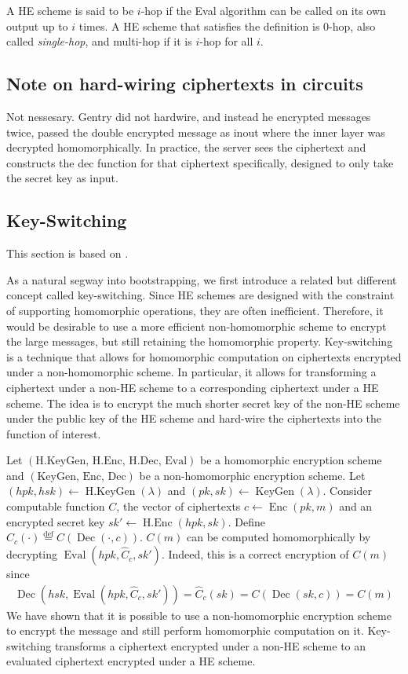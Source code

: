 A HE scheme is said to be $i$-hop if the Eval algorithm can be called on its own output up to $i$ times. A HE scheme that satisfies the definition is $0$-hop, also called \textit{single-hop}, and multi-hop if it is $i$-hop for all $i$. 

\subsection*{Note on hard-wiring ciphertexts in circuits}
Not nessesary. Gentry did not hardwire, and instead he encrypted messages twice, passed the double encrypted message as inout where the inner layer was decrypted homomorphically.
In practice, the server sees the ciphertext and constructs the dec function for that ciphertext specifically, designed to only take the secret key as input.

\subsection*{Key-Switching}
This section is based on \cite{Bra18-survey}.

As a natural segway into bootstrapping, we first introduce a related but different concept called key-switching. Since HE schemes are designed with the constraint of supporting homomorphic operations, they are often inefficient. Therefore, it would be desirable to use a more efficient non-homomorphic scheme to encrypt the large messages, but still retaining the homomorphic property. Key-switching is a technique that allows for homomorphic computation on ciphertexts encrypted under a non-homomorphic scheme. In particular, it allows for transforming a ciphertext under a non-HE scheme to a corresponding ciphertext under a HE scheme. The idea is to encrypt the much shorter secret key of the non-HE scheme under the public key of the HE scheme and hard-wire the ciphertexts into the function of interest.

Let $(\text{H.KeyGen, H.Enc, H.Dec, Eval})$ be a homomorphic encryption scheme and $(\text{KeyGen, Enc, Dec})$ be a non-homomorphic encryption scheme. Let $(hpk,hsk) \leftarrow \operatorname{H.KeyGen}(\lambda)$ and $(pk,sk) \leftarrow \operatorname{KeyGen}(\lambda)$. Consider computable function $C$, the vector of ciphertexts $c \leftarrow \operatorname{Enc}(pk,m)$ and an encrypted secret key $sk' \leftarrow \operatorname{H.Enc}(hpk,sk)$. Define $\hat{C}_c(\cdot) \stackrel{\mathrm{def}}{=} C(\operatorname{Dec}(\cdot, c))$. $C(m)$ can be computed homomorphically by decrypting $\operatorname{Eval}(hpk,\hat{C}_c, sk')$. Indeed, this is a correct encryption of $C(m)$ since
\begin{equation*}
    \begin{aligned}
        \operatorname{Dec}(hsk,\operatorname{Eval}(hpk,\hat{C}_c, sk')) = \hat{C}_c(sk) = C(\operatorname{Dec}(sk, c)) = C(m)
    \end{aligned}
\end{equation*}
We have shown that it is possible to use a non-homomorphic encryption scheme to encrypt the message and still perform homomorphic computation on it. Key-switching transforms a ciphertext encrypted under a non-HE scheme to an evaluated ciphertext encrypted under a HE scheme.

